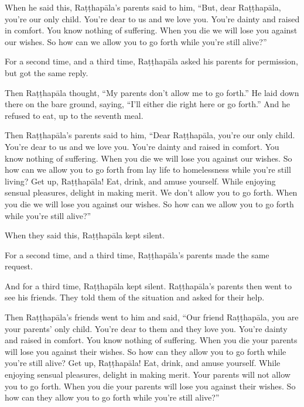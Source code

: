 \documentclass[12pt,openany]{book}%
\begin{document}
When he said this, \textsanskrit{Raṭṭhapāla}’s parents said to him, “But, dear \textsanskrit{Raṭṭhapāla}, you’re our only child. You’re dear to us and we love you. You’re dainty and raised in comfort. You know nothing of suffering. When you die we will lose you against our wishes. So how can we allow you to go forth while you’re still alive?” 

For a second time, and a third time, \textsanskrit{Raṭṭhapāla} asked his parents for permission, but got the same reply. 

Then \textsanskrit{Raṭṭhapāla} thought, “My parents don’t allow me to go forth.” He laid down there on the bare ground, saying, “I’ll either die right here or go forth.” And he refused to eat, up to the seventh meal. 

Then \textsanskrit{Raṭṭhapāla}’s parents said to him, “Dear \textsanskrit{Raṭṭhapāla}, you’re our only child. You’re dear to us and we love you. You’re dainty and raised in comfort. You know nothing of suffering. When you die we will lose you against our wishes. So how can we allow you to go forth from lay life to homelessness while you’re still living? Get up, \textsanskrit{Raṭṭhapāla}! Eat, drink, and amuse yourself. While enjoying sensual pleasures, delight in making merit. We don’t allow you to go forth. When you die we will lose you against our wishes. So how can we allow you to go forth while you’re still alive?” 

When they said this, \textsanskrit{Raṭṭhapāla} kept silent. 

For a second time, and a third time, \textsanskrit{Raṭṭhapāla}’s parents made the same request. 

And for a third time, \textsanskrit{Raṭṭhapāla} kept silent. \textsanskrit{Raṭṭhapāla}’s parents then went to see his friends. They told them of the situation and asked for their help. 

Then \textsanskrit{Raṭṭhapāla}’s friends went to him and said, “Our friend \textsanskrit{Raṭṭhapāla}, you are your parents’ only child. You’re dear to them and they love you. You’re dainty and raised in comfort. You know nothing of suffering. When you die your parents will lose you against their wishes. So how can they allow you to go forth while you’re still alive? Get up, \textsanskrit{Raṭṭhapāla}! Eat, drink, and amuse yourself. While enjoying sensual pleasures, delight in making merit. Your parents will not allow you to go forth. When you die your parents will lose you against their wishes. So how can they allow you to go forth while you’re still alive?” 
\end{document}
